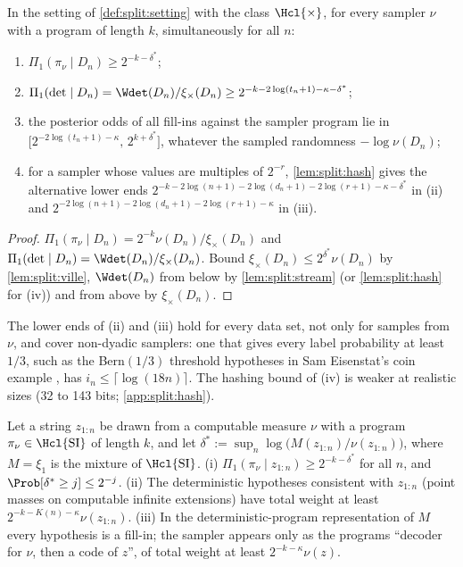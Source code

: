\begin{theorem}[SFI at $\lambda=1$]\label{thm:split:lambda1}
In the setting of \cref{def:split:setting} with the class $\Hcl{\times}$, for every sampler $\nu$ with a program of length $k$, simultaneously for all $n$:
\begin{enumerate}[label=(\roman*)]
\item $\Pi_1(\pi_\nu\mid D_n)\ge2^{-k-\delta^*}$;
\item $\Pi_1(\det\mid D_n)=\Wdet(D_n)/\xi_\times(D_n)\ge2^{-k-2\log(t_n+1)-\kappa-\delta^*}$;
\item the posterior odds of all fill-ins against the sampler program lie in $\big[2^{-2\log(t_n+1)-\kappa},\,2^{k+\delta^*}\big]$, whatever the sampled randomness $-\log\nu(D_n)$;
\item for a sampler whose values are multiples of $2^{-r}$, \cref{lem:split:hash} gives the alternative lower ends $2^{-k-2\log(n+1)-2\log(d_n+1)-2\log(r+1)-\kappa-\delta^*}$ in (ii) and $2^{-2\log(n+1)-2\log(d_n+1)-2\log(r+1)-\kappa}$ in (iii).
\end{enumerate}
\end{theorem}

\begin{proof}
$\Pi_1(\pi_\nu\mid D_n)=2^{-k}\nu(D_n)/\xi_\times(D_n)$ and $\Pi_1(\det\mid D_n)=\Wdet(D_n)/\xi_\times(D_n)$. Bound $\xi_\times(D_n)\le2^{\delta^*}\nu(D_n)$ by \cref{lem:split:ville}, $\Wdet(D_n)$ from below by \cref{lem:split:stream} (or \cref{lem:split:hash} for (iv)) and from above by $\xi_\times(D_n)$.
\end{proof}

The lower ends of (ii) and (iii) hold for every data set, not only for samples from $\nu$, and cover non-dyadic samplers: one that gives every label probability at least $1/3$, such as the Bern$(1/3)$ threshold hypotheses in Sam Eisenstat's coin example \citep{hanni2026request,claudeSFI2026fundamentals}, has $i_n\le\lceil\log(18n)\rceil$. The hashing bound of (iv) is weaker at realistic sizes (32 to 143 bits; \cref{app:split:hash}).

\begin{proposition}[SI at $\lambda=1$]\label{prop:split:si}
Let a string $z_{1:n}$ be drawn from a computable measure $\nu$ with a program $\pi_\nu\in\Hcl{\mathrm{SI}}$ of length $k$, and let $\delta^*:=\sup_n\log\big(M(z_{1:n})/\nu(z_{1:n})\big)$, where $M=\xi_1$ is the mixture of $\Hcl{\mathrm{SI}}$.
(i) $\Pi_1(\pi_\nu\mid z_{1:n})\ge2^{-k-\delta^*}$ for all $n$, and $\Prob[\delta^*\ge j]\le2^{-j}$. (ii) The deterministic hypotheses consistent with $z_{1:n}$ (point masses on computable infinite extensions) have total weight at least $2^{-k-K(n)-\kappa}\nu(z_{1:n})$. (iii) In the deterministic-program representation of $M$ every hypothesis is a fill-in; the sampler appears only as the programs ``decoder for $\nu$, then a code of $z$'', of total weight at least $2^{-k-\kappa}\nu(z)$.
\end{proposition}


